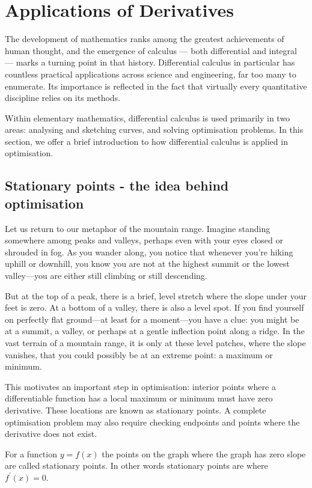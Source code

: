 \section{Applications of Derivatives}
\label{sec:ch10-applications}

The development of mathematics ranks among the greatest achievements of human thought, and the emergence of calculus — both differential and integral — marks a turning point in that history. Differential calculus in particular has countless practical applications across science and engineering, far too many to enumerate. Its importance is reflected in the fact that virtually every quantitative discipline relies on its methods.

Within elementary mathematics, differential calculus is used primarily in two areas: analysing and sketching curves, and solving optimisation problems. In this section, we offer a brief introduction to how differential calculus is applied in optimisation.


\subsection*{Stationary points - the idea behind optimisation}
Let us return to our metaphor of the mountain range. Imagine standing somewhere among peaks and valleys, perhaps even with your eyes closed or shrouded in fog. As you wander along, you notice that whenever you’re hiking uphill or downhill, you know you are not at the highest summit or the lowest valley—you are either still climbing or still descending.

But at the top of a peak, there is a brief, level stretch where the slope under your feet is zero. At a bottom of a valley, there is also a level spot. If you find yourself on perfectly flat ground—at least for a moment—you have a clue: you might be at a summit, a valley, or perhaps at a gentle inflection point along a ridge. In the vast terrain of a mountain range, it is only at these level patches, where the slope vanishes, that you could possibly be at an extreme point: a maximum or minimum.

This motivates an important step in optimisation: interior points where a differentiable function has a local maximum or minimum must have zero derivative. These locations are known as stationary points. A complete optimisation problem may also require checking endpoints and points where the derivative does not exist.

\begin{definition}
     For a function $y=f(x)$ the points on the graph where the graph has zero slope are called stationary points. In other words stationary points are where $f^{\prime}(x)=0$.
    \end{definition}

